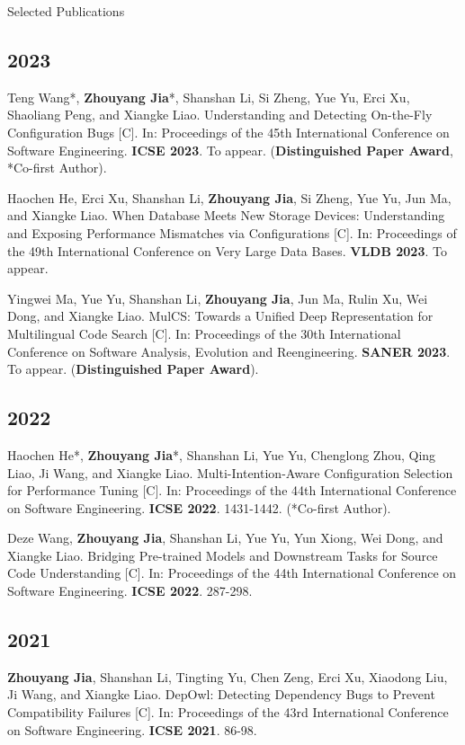 \documentclass{resume}
\begin{document}
\begin{rSection}{Selected Publications}
    \subsection*{2023}

    Teng Wang*, \textbf{Zhouyang Jia}*, Shanshan Li, Si Zheng, Yue Yu, Erci Xu, Shaoliang Peng, and Xiangke Liao. Understanding and Detecting On-the-Fly Configuration Bugs [C]. In: Proceedings of the 45th International Conference on Software Engineering. \textbf{ICSE 2023}. To appear. (\textbf{Distinguished Paper Award}, *Co-first Author).

    Haochen He, Erci Xu, Shanshan Li, \textbf{Zhouyang Jia}, Si Zheng, Yue Yu, Jun Ma, and Xiangke Liao. When Database Meets New Storage Devices: Understanding and Exposing Performance Mismatches via Configurations [C]. In: Proceedings of the 49th International Conference on Very Large Data Bases. \textbf{VLDB 2023}. To appear.

    Yingwei Ma, Yue Yu, Shanshan Li, \textbf{Zhouyang Jia}, Jun Ma, Rulin Xu, Wei Dong, and Xiangke Liao. MulCS: Towards a Unified Deep Representation for Multilingual Code Search [C]. In: Proceedings of the 30th International Conference on Software Analysis, Evolution and Reengineering. \textbf{SANER 2023}. To appear. (\textbf{Distinguished Paper Award}).

    \subsection*{2022}

    Haochen He*, \textbf{Zhouyang Jia}*, Shanshan Li, Yue Yu, Chenglong Zhou, Qing Liao, Ji Wang, and Xiangke Liao. Multi-Intention-Aware Configuration Selection for Performance Tuning [C]. In: Proceedings of the 44th International Conference on Software Engineering. \textbf{ICSE 2022}. 1431-1442. (*Co-first Author).

    Deze Wang, \textbf{Zhouyang Jia}, Shanshan Li, Yue Yu, Yun Xiong, Wei Dong, and Xiangke Liao. Bridging Pre-trained Models and Downstream Tasks for Source Code Understanding [C]. In: Proceedings of the 44th International Conference on Software Engineering. \textbf{ICSE 2022}. 287-298.

    \subsection*{2021}

    \textbf{Zhouyang Jia}, Shanshan Li, Tingting Yu, Chen Zeng, Erci Xu, Xiaodong Liu, Ji Wang, and Xiangke Liao. DepOwl: Detecting Dependency Bugs to Prevent Compatibility Failures [C]. In: Proceedings of the 43rd International Conference on Software Engineering. \textbf{ICSE 2021}. 86-98.


\end{rSection}
\end{document}
